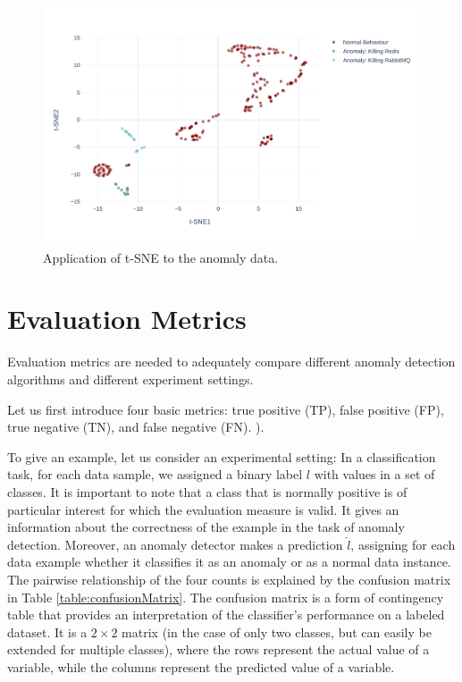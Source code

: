 \begin{figure}[!h]
    \centering
    \includegraphics[width=\textwidth]{img/tsne-anomalies-vs-normal.pdf}
    \caption{Application of t-SNE to the anomaly data.}
    \label{fig:tsne-anomalies}
\end{figure}

\section{Evaluation Metrics}
\label{section:evaluationMetrics}
Evaluation metrics are needed to adequately compare different anomaly detection algorithms and different experiment settings.

Let us first introduce four basic metrics: true positive (TP), false positive (FP), true negative (TN), and false negative (FN). ). 

To give an example, let us consider an experimental setting: In a classification task, for each data sample, we assigned a binary label $l$ with values in a set of classes. It is important to note that a class that is normally positive is of particular interest for which the evaluation measure is valid. It gives an information about the correctness of the example in the task of anomaly detection. Moreover, an anomaly detector makes a prediction $\hat{l}$, assigning for each data example whether it classifies it as an anomaly or as a normal data instance. The pairwise relationship of the four counts is explained by the confusion matrix in Table \ref{table:confusionMatrix}. The confusion matrix is a form of contingency table that provides an interpretation of the classifier's performance on a labeled dataset. It is a $2 \times 2$ matrix (in the case of only two classes, but can easily be extended for multiple classes), where the rows represent the actual value of a variable, while the columns represent the predicted value of a variable.

